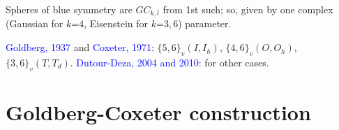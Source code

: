 \documentclass{beamer}
\begin{document}
\begin{frame}
\begin{enumerate}
\end{enumerate}
\pause

Spheres of blue symmetry  are  $GC_{k,l}$ from 1st such; so, given
 by one complex (Gaussian for $k$=$4$, Eisenstein for $k$=$3,6$) 
parameter.


\textcolor{blue}{Goldberg, 1937} and \textcolor{blue}{Coxeter, 1971}: 
$\{5,6\}_v(I,I_h)$, $\{4,6\}_v(O,O_h)$,  
$\{3,6\}_v(T,T_d)$. 
\textcolor{blue}{Dutour-Deza, 2004 and  2010}: for other cases.
\end{frame}

\section[]{Goldberg-Coxeter construction}

\end{document}
